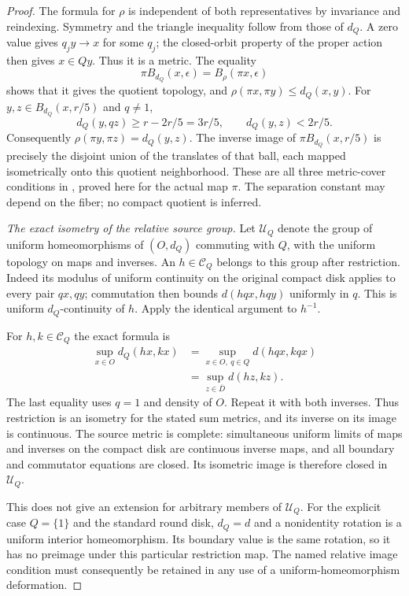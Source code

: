 \begin{proof}
The formula for $\rho$ is independent of both
representatives by invariance and reindexing.
Symmetry and the triangle inequality follow
from those of $d_Q$. A zero value gives
$q_jy\to x$ for some $q_j$; the closed-orbit
property of the proper action then gives
$x\in Qy$. Thus it is a metric. The equality
\[
 \pi B_{d_Q}(x,\epsilon)=B_\rho(\pi x,\epsilon)
                                                               \tag{C.81.5}
\]
shows that it gives the quotient topology,
and $\rho(\pi x,\pi y)\leq d_Q(x,y)$.
For $y,z\in B_{d_Q}(x,r/5)$ and $q\ne1$,
\[
 d_Q(y,qz)\geq r-2r/5=3r/5,
                    \qquad d_Q(y,z)<2r/5.
                                                               \tag{C.81.6}
\]
Consequently $\rho(\pi y,\pi z)=d_Q(y,z)$.
The inverse image of $\pi B_{d_Q}(x,r/5)$
is precisely the disjoint union of the translates
of that ball, each mapped isometrically onto
this quotient neighborhood. These are all
three metric-cover conditions in
\cite[Definition~2.1]{C_YagasakiUniform2014},
proved here for the actual map $\pi$.
The separation constant may depend on the
fiber; no compact quotient is inferred.

\emph{The exact isometry of the relative source group.}
Let $\mathscr U_Q$ denote the group of uniform
homeomorphisms of $(O,d_Q)$ commuting with $Q$,
with the uniform topology on maps and inverses.
An $h\in\mathscr C_Q$ belongs to this group
after restriction. Indeed its modulus of
uniform continuity on the original compact
disk applies to every pair $qx,qy$; commutation
then bounds $d(hqx,hqy)$ uniformly in $q$.
This is uniform $d_Q$-continuity of $h$.
Apply the identical argument to $h^{-1}$.

For $h,k\in\mathscr C_Q$ the exact formula is
\[
 \begin{split}
 \sup_{x\in O}d_Q(hx,kx)
   &=\sup_{x\in O,\ q\in Q}d(hqx,kqx)\\
   &=\sup_{z\in\overline D}d(hz,kz).
 \end{split}                                                   \tag{C.81.7}
\]
The last equality uses $q=1$ and density of
$O$. Repeat it with both inverses. Thus
restriction is an isometry for the stated
sum metrics, and its inverse on its image
is continuous. The source metric is complete:
simultaneous uniform limits of maps and
inverses on the compact disk are continuous
inverse maps, and all boundary and commutator
equations are closed. Its isometric image
is therefore closed in $\mathscr U_Q$.

This does not give an extension for arbitrary
members of $\mathscr U_Q$. For the explicit
case $Q=\{1\}$ and the standard round disk,
$d_Q=d$ and a nonidentity rotation is a
uniform interior homeomorphism. Its boundary
value is the same rotation, so it has no
preimage under this particular restriction
map. The named relative image condition
must consequently be retained in any use
of a uniform-homeomorphism deformation.


\end{proof}
